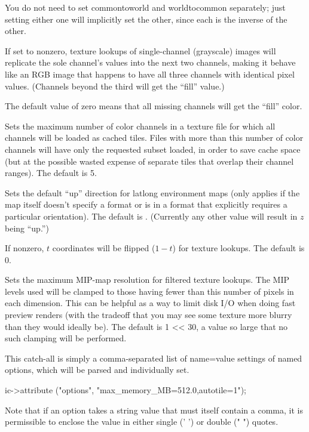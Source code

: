 You do not need to set {\cf commontoworld} and {\cf worldtocommon}
separately; just setting either one will implicitly set the other, since
each is the inverse of the other.
\apiend

If set to nonzero, texture lookups of single-channel (grayscale) 
images will replicate the sole channel's values into the next two
channels, making it behave like an RGB image that happens to have all
three channels with identical pixel values.  (Channels beyond the third
will get the ``fill'' value.)

The default value of zero means that all missing channels will get
the ``fill'' color.
\apiend

Sets the maximum number of color channels in a texture file for which all
channels will be loaded as cached tiles. Files with more than this number
of color channels will have only the requested subset loaded, in order
to save cache space (but at the possible wasted expense of separate tiles
that overlap their channel ranges). The default is 5.
\apiend

Sets the default ``up'' direction for latlong environment maps (only
applies if the map itself doesn't specify a format or is in a format
that explicitly requires a particular orientation).  The default is
.  (Currently any other value will result in $z$ being ``up.'')
\apiend

If nonzero, $t$ coordinates will be flipped ($1-t$) for texture lookups.
The default is 0.
\apiend

\NEW %
Sets the maximum MIP-map resolution for filtered texture lookups. The MIP
levels used will be clamped to those having fewer than this number of pixels
in each dimension. This can be helpful as a way to limit disk I/O when doing
fast preview renders (with the tradeoff that you may see some texture more
blurry than they would ideally be). The default is 1 << 30, a value so large
that no such clamping will be performed.
\apiend

This catch-all is simply a comma-separated list of {\cf name=value}
settings of named options, which will be parsed and individually set.
\begin{code}
        ic->attribute ("options", "max_memory_MB=512.0,autotile=1");
\end{code}
Note that if an option takes a string value that must itself contain a
comma, it is permissible to enclose the value in either single ({\cf ' '})
or double ({\cf " "}) quotes.
\apiend



